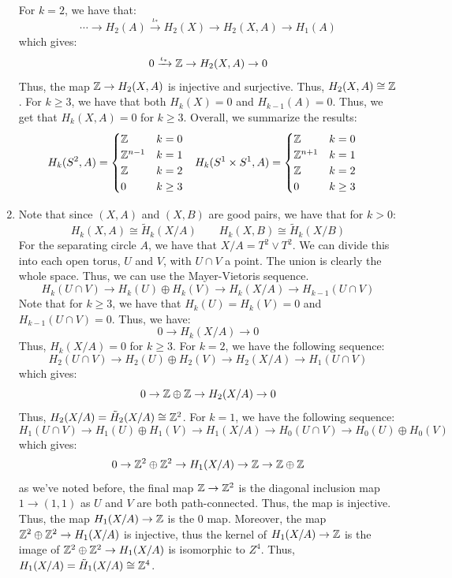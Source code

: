 \documentclass[12pt]{article}
\begin{document}
\begin{solution}
\begin{enumerate}
        For $k = 2$, we have that: 
        \[ \cdots \to H_2(A) \xrightarrow{\iota_*} H_2(X) \to H_2(X,A) \to H_1(A)\]
        which gives:
        \[ 0 \xrightarrow{\iota_*} \mathbb Z \to H_2(X,A) \to 0 \]
        Thus, the map $\mathbb Z \to H_2(X, A)$ is injective and surjective. Thus, $H_2(X, A) \cong \mathbb Z$. \bbni
        For $k \geq 3$, we have that both $H_k(X) = 0$ and $H_{k-1}(A) = 0$. Thus, we get that $H_k(X, A) = 0$ for $k \geq 3$. \bbni
        Overall, we summarize the results:
        \begin{align*}
            H_k(S^2, A) &= \begin{cases} \mathbb Z & k = 0 \\ \mathbb Z^{n-1} & k = 1\\ \mathbb Z& k = 2 \\ 0 & k \geq 3\end{cases} & H_k(S^1 \times S^1, A) &= \begin{cases} \mathbb Z & k = 0 \\ \mathbb Z^{n+1} & k = 1\\ \mathbb Z& k = 2 \\ 0 & k \geq 3\end{cases}
        \end{align*}       
        \item Note that since $(X, A)$ and $(X, B)$ are good pairs, we have that for $k > 0$: 
        \[ H_k(X, A) \cong \tilde{H}_k(X/A) \qquad H_k(X, B) \cong \tilde{H}_k(X/B)\]
        For the separating circle $A$, we have that $X/A = T^2 \vee T^2$. We can divide this into each open torus, $U$ and $V$, with $U \cap V$ a point. The union is clearly the whole space. Thus, we can use the Mayer-Vietoris sequence. 
        \[ H_k(U \cap V) \to H_k(U) \oplus H_k(V) \to H_k(X/A) \to H_{k-1}(U \cap V)\]
        Note that for $k \geq 3$, we have that $H_k(U) = H_k(V) = 0$ and $H_{k-1}(U \cap V) = 0$. Thus, we have:
        \[ 0 \to H_k(X/A) \to 0\]
        Thus, $H_k(X/A) = 0$ for $k \geq 3$. \bbni
        For $k = 2$, we have the following sequence:
        \[ H_2(U \cap V) \to H_2(U) \oplus H_2(V) \to H_2(X/A) \to H_{1}(U \cap V)  \]
        which gives:
        \[ 0 \to \mathbb Z \oplus \mathbb Z \to H_2(X/A) \to 0  \]
        Thus, $H_2(X/A) = \tilde H_2(X/A) \cong \mathbb Z^2$. \bbni
        For $k = 1$, we have the following sequence:
        \[ H_1(U \cap V) \to H_1(U) \oplus H_1(V) \to H_1(X/A) \to H_0(U \cap V) \to H_0(U) \oplus H_0(V) \]
        which gives:
        \[ 0 \to \mathbb Z^2 \oplus \mathbb Z^2 \to H_1(X/A) \to \mathbb Z \to \mathbb Z \oplus \mathbb Z  \]             
        as we've noted before, the final map $\mathbb Z \to \mathbb Z^2$ is the diagonal inclusion map $1 \to (1, 1)$ as $U$ and $V$ are both path-connected. Thus, the map is injective. Thus, the map $H_1(X/A) \to \mathbb Z$ is the $0$ map. Moreover, the map $\mathbb Z^2 \oplus \mathbb Z^2 \to H_1(X/A)$ is injective, thus the kernel of $H_1(X/A) \to \mathbb Z$ is the image of $\mathbb Z^2 \oplus \mathbb Z^2 \to H_1(X/A)$ is isomorphic to $Z^4$. Thus, $H_1(X/A) = \tilde H_1(X/A) \cong \mathbb Z^4$. \bbni

\end{enumerate}
\end{solution}
\end{document}
